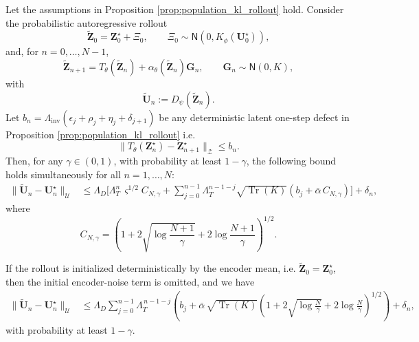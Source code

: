 \documentclass[11pt]{article}
\newcommand{\jg}[1]{{\color{red}#1}}
\begin{document}
\begin{proposition}
\label{prop:high-prob-autoregressive-rollout}
Let the assumptions in Proposition \ref{prop:population_kl_rollout} %
hold. Consider the probabilistic autoregressive rollout
\[
    \widetilde{\mathbf Z}_0
    =
    \mathbf Z_0^\star+\Xi_0,
    \qquad
    \Xi_0\sim\mathsf N(0,K_\phi(\mathbf U_0^\star)),
\]
and, for $n=0,\ldots,N-1$,
\[
    \widetilde{\mathbf Z}_{n+1}
    =
    T_\theta(\widetilde{\mathbf Z}_n)
    +
    \alpha_\theta(\widetilde{\mathbf Z}_n)\mathbf G_n,
    \qquad
    \mathbf G_n\sim\mathsf N(0,K),
\]
with
\[
    \widetilde{\mathbf U}_n:=D_\psi(\widetilde{\mathbf Z}_n).
\]
Let $b_n=\Lambda_{\mathrm{inv}}(\epsilon_j+\rho_j+\eta_j+\delta_{j+1})$ be any deterministic latent one-step defect in Proposition \ref{prop:population_kl_rollout} %
i.e.
\[
    \|T_\theta(\mathbf Z_n^\star)-\mathbf Z_{n+1}^\star\|_{\mathcal Z}
    \le b_n .
\]
Then, for any $\gamma\in(0,1)$, with probability at least $1-\gamma$, the following bound holds
simultaneously for all $n=1,\ldots,N$:
\[
\begin{aligned}
    \|\widetilde{\mathbf U}_n-\mathbf U_n^\star\|_{\mathcal U}
    &\le
    \Lambda_D
    \Bigg[
    \Lambda_T^n\,\varsigma^{1/2}C_{N,\gamma}
    +
    \sum_{j=0}^{n-1}
    \Lambda_T^{n-1-j}
    \sqrt{\operatorname{Tr}(K)}\left(
        b_j
        +
        \bar\alpha\,C_{N,\gamma}
    \right)
    \Bigg]
    +
    \delta_n,
\end{aligned}
\]
where $$C_{N,\gamma}=\left(1+2\sqrt{\log\frac{N+1}{\gamma}}+2\log\frac{N+1}{\gamma}\right)^{1/2}.$$
\end{proposition}
\begin{remark}\label{rem:probabilistic-rollout-bound}
If the rollout is initialized deterministically by the encoder mean, i.e.
$\widetilde{\mathbf Z}_0=\mathbf Z_0^\star$, then the initial encoder-noise term is omitted, and we have
\[
\begin{aligned}
    \|\widetilde{\mathbf U}_n-\mathbf U_n^\star\|_{\mathcal U}
    &\le
    \Lambda_D
    \sum_{j=0}^{n-1}
    \Lambda_T^{\,n-1-j}
    \left(
        b_j
        +
        \bar\alpha\,
        \sqrt{\operatorname{Tr}(K)}\left(1+2\sqrt{\log\frac{N}{\gamma}}+2\log\frac{N}{\gamma}\right)^{1/2}
    \right)
    +
    \delta_n ,
\end{aligned}
\]
with probability at least $1-\gamma$.
\end{remark}
\end{document}

